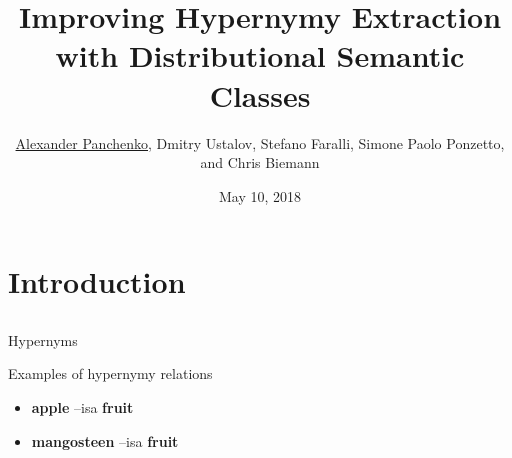\documentclass[usenames,dvipsnames]{beamer}
\title{Improving Hypernymy Extraction with Distributional Semantic Classes}
\author[Panchenko et al. LREC'18]{\underline{Alexander Panchenko}, Dmitry Ustalov, Stefano Faralli, Simone Paolo Ponzetto, and Chris Biemann}
\date[10.05.2018]{May 10, 2018}
\begin{document}
\maketitle

%
\section{Introduction}
\subsection{}


\begin{frame}{Hypernyms}

\begin{block}{Examples of hypernymy relations}
\begin{itemize}
	\item \textbf{apple} --isa\textrightarrow \textbf{ fruit}
	\item \textbf{mangosteen} --isa\textrightarrow \textbf{ fruit}
\end{itemize}
\end{block}

\vspace{87pt}

$ $ 
\end{frame}
\end{document}
